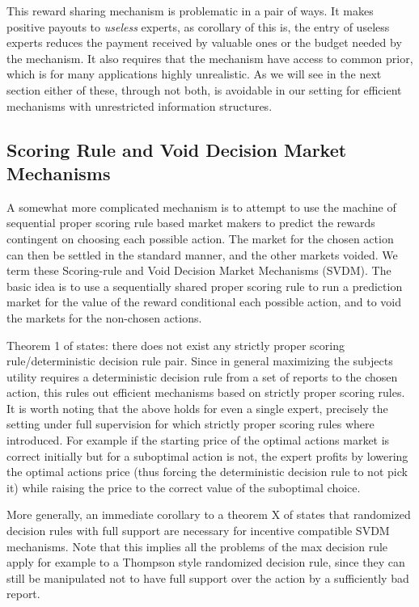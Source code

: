 This reward sharing mechanism is problematic in a pair of ways. It makes positive payouts to  \emph{useless} experts, as corollary of this is, the entry of useless experts reduces the payment received by valuable ones or the budget needed by the mechanism. It also requires that the mechanism have access to common prior, which is for many applications highly unrealistic. 
As we will see in the next section either of these, through not both, is avoidable in our setting for efficient mechanisms with unrestricted information structures. 



\subsection{Scoring Rule and Void Decision Market Mechanisms}


A somewhat more complicated mechanism is to attempt to use the machine of sequential proper scoring rule based market makers to predict the rewards contingent on choosing each possible action. The market for the chosen action can then be settled in the standard manner, and the other markets voided. 
We term these Scoring-rule and Void Decision Market Mechanisms (SVDM). The basic idea is to use a sequentially shared proper scoring rule to run a prediction market for the value of the reward conditional each possible action, and to void the markets for the non-chosen actions.  

Theorem 1 of \cite{othman2010decision} states: there does not exist any strictly proper scoring rule/deterministic decision rule pair.
Since in general maximizing the subjects utility requires a deterministic decision rule from a set of reports to the chosen action, this rules out efficient mechanisms based on strictly proper scoring rules. 
It is worth noting that the above holds for even a single expert, precisely the setting under full supervision for which strictly proper scoring rules where introduced. 
For example if the starting price of the optimal actions market is correct initially but for a suboptimal action is not, the expert profits by lowering the optimal actions price (thus forcing the deterministic decision rule to not pick it) while raising the price to the correct value of the suboptimal choice. 

More generally, an immediate corollary to a theorem X of \cite{chen2014eliciting} states that randomized decision rules with full support are necessary for incentive compatible SVDM mechanisms.
Note that this implies all the problems of the max decision rule apply for example to a Thompson style randomized decision rule, since they can still be manipulated not to have full support over the action by a sufficiently bad report.

